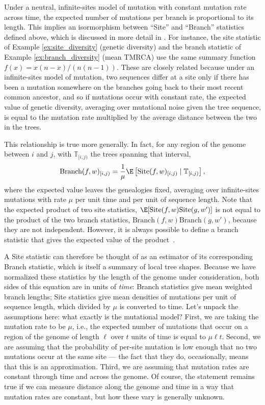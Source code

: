 \documentclass{article}
\newcommand{\branch}{\mbox{Branch}} %
\newcommand{\site}{\mbox{Site}} %
\newcommand{\given}{\;\vert\;}
\newcommand{\treeseq}{\mathbb{T}} %
\newcommand{\iw}{w} %
\begin{document}
Under a neutral, infinite-sites model of mutation with constant mutation rate across time,
the expected number of mutations per branch is proportional to its length.
This implies an isormorphism between ``Site'' and ``Branch'' statistics defined above,
which is discussed in more detail in \citet{ralph2019empirical}.
For instance, the site statistic of Example \ref{ex:site_diversity} (genetic diversity)
and the branch statistic of Example \ref{ex:branch_diversity} (mean TMRCA)
use the same summary function $f(x) = x(n-x)/\left(n(n-1)\right)$.
These are closely related because under an infinite-sites model of mutation,
two sequences differ at a site only if there has been a mutation somewhere on the branches going back
to their most recent common ancestor,
and so if mutations occur with constant rate,
the expected value of genetic diversity,
averaging over mutational noise given the tree sequence,
is equal to the mutation rate multiplied by the average distance between the two in the trees.

This relationship is true more generally.
In fact, for any region of the genome between $i$ and $j$,
with $\treeseq_{[i,j)}$ the trees spanning that interval,
\begin{align}
    \branch(f, \iw)_{[i,j)}
    =
    \frac{1}{\mu}
    \E\left[ \site(f, \iw)_{[i,j)} \given \treeseq_{[i,j)} \right] ,
\end{align}
where the expected value leaves the genealogies fixed,
averaging over infinite-sites mutations
with rate $\mu$ per unit time and per unit of sequence length.
Note that the expected product of two site statistics,
$\E[\site(f, \iw) \site(g, \iw')]$
is not equal to the product of the two branch statistics, $\branch(f, \iw) \branch(g, \iw')$,
because they are not independent.
However, it is always possible to define a branch statistic that
gives the expected value of the product~\citep{ralph2019empirical}.

A Site statistic can therefore be thought of as an estimator of its corresponding Branch statistic,
which is itself a summary of local tree shapes.
Because we have normalized these statistics by the length of the genome under consideration,
both sides of this equation are in units of \emph{time}:
Branch statistics give mean weighted branch lengths;
Site statistics give mean densities of mutations per unit of sequence length,
which divided by $\mu$ is converted to time.
Let's unpack the assumptions here: what exactly is the mutational model?
First, we are taking the mutation rate to be $\mu$, i.e.,
the expected number of mutations that occur on a region of the genome of length $\ell$
over $t$ units of time is equal to $\mu \ell t$.
Second, we are assuming that the probability of per-site mutation is low enough
that no two mutations occur at the same site
--- the fact that they do, occasionally, means that this is an approximation.
Third, we are assuming that mutation rates are constant through time and across the genome.
Of course, the statement remains true if we can measure distance along the genome and time
in a way that mutation rates are constant, but how these vary is generally unknown.
\end{document}
